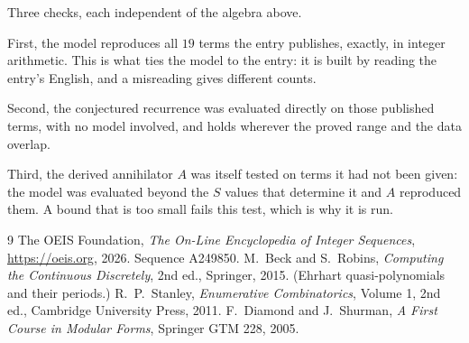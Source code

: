 \documentclass[11pt,a4paper]{article}
\theoremstyle{plain}
\theoremstyle{definition}
\begin{document}
Three checks, each independent of the algebra above.

First, the model reproduces all $19$ terms the entry publishes, exactly, in integer
arithmetic. This is what ties the model to the entry: it is built by reading the entry's
English, and a misreading gives different counts.

Second, the conjectured recurrence was evaluated directly on those published terms, with no
model involved, and holds wherever the proved range and the data overlap.

Third, the derived annihilator $A$ was itself tested on terms it had not been given: the model
was evaluated beyond the $S$ values that determine it and $A$ reproduced them. A bound that is
too small fails this test, which is why it is run.

\begin{thebibliography}{9}
 The OEIS Foundation, \emph{The On-Line Encyclopedia of Integer
Sequences}, \url{https://oeis.org}, 2026. Sequence A249850.
 M.~Beck and S.~Robins, \emph{Computing the Continuous Discretely},
2nd ed., Springer, 2015. (Ehrhart quasi-polynomials and their periods.)
 R.~P.~Stanley, \emph{Enumerative Combinatorics}, Volume 1, 2nd ed.,
Cambridge University Press, 2011.
 F.~Diamond and J.~Shurman, \emph{A First Course in Modular Forms},
Springer GTM 228, 2005.
\end{thebibliography}
\end{document}
